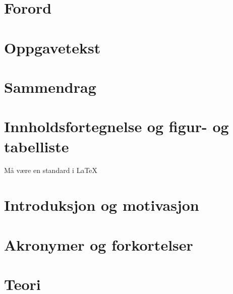 \documentclass{article}
\begin{document}

\newpage


\section{Forord} %
\label{sec:forord}

\newpage


\section{Oppgavetekst} %
\label{sec:oppgavetekst}

\newpage


\section{Sammendrag} %
\label{sec:sammendrag}

\newpage


\section{Innholdsfortegnelse og figur- og tabelliste} %
\label{sec:innholdsfortegnelse_og_figur_og_tabelliste}
Må være en standard i \LaTeX
\newpage


\section{Introduksjon og motivasjon} %
\label{sec:introduksjon_og_motivasjon}



\newpage


\section{Akronymer og forkortelser} %
\label{sec:akronymer_og_forkortelser}

\newpage


\section{Teori} %
\label{sec:teori}

\newpage
\end{document}
